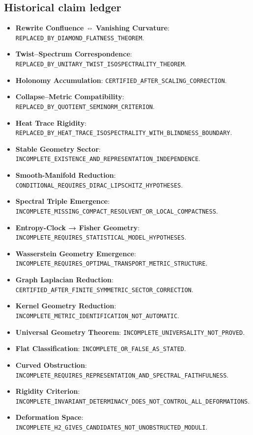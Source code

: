 \documentclass[12pt, oneside]{article}
\begin{document}
\subsection{Historical claim ledger}
\begin{itemize}
\item \textbf{Rewrite Confluence ⇔ Vanishing Curvature}: \texttt{REPLACED\_BY\_DIAMOND\_FLATNESS\_THEOREM}.
\item \textbf{Twist–Spectrum Correspondence}: \texttt{REPLACED\_BY\_UNITARY\_TWIST\_ISOSPECTRALITY\_THEOREM}.
\item \textbf{Holonomy Accumulation}: \texttt{CERTIFIED\_AFTER\_SCALING\_CORRECTION}.
\item \textbf{Collapse–Metric Compatibility}: \texttt{REPLACED\_BY\_QUOTIENT\_SEMINORM\_CRITERION}.
\item \textbf{Heat Trace Rigidity}: \texttt{REPLACED\_BY\_HEAT\_TRACE\_ISOSPECTRALITY\_WITH\_BLINDNESS\_BOUNDARY}.
\item \textbf{Stable Geometry Sector}: \texttt{INCOMPLETE\_EXISTENCE\_AND\_REPRESENTATION\_INDEPENDENCE}.
\item \textbf{Smooth-Manifold Reduction}: \texttt{CONDITIONAL\_REQUIRES\_DIRAC\_LIPSCHITZ\_HYPOTHESES}.
\item \textbf{Spectral Triple Emergence}: \texttt{INCOMPLETE\_MISSING\_COMPACT\_RESOLVENT\_OR\_LOCAL\_COMPACTNESS}.
\item \textbf{Entropy-Clock → Fisher Geometry}: \texttt{INCOMPLETE\_REQUIRES\_STATISTICAL\_MODEL\_HYPOTHESES}.
\item \textbf{Wasserstein Geometry Emergence}: \texttt{INCOMPLETE\_REQUIRES\_OPTIMAL\_TRANSPORT\_METRIC\_STRUCTURE}.
\item \textbf{Graph Laplacian Reduction}: \texttt{CERTIFIED\_AFTER\_FINITE\_SYMMETRIC\_SECTOR\_CORRECTION}.
\item \textbf{Kernel Geometry Reduction}: \texttt{INCOMPLETE\_METRIC\_IDENTIFICATION\_NOT\_AUTOMATIC}.
\item \textbf{Universal Geometry Theorem}: \texttt{INCOMPLETE\_UNIVERSALITY\_NOT\_PROVED}.
\item \textbf{Flat Classification}: \texttt{INCOMPLETE\_OR\_FALSE\_AS\_STATED}.
\item \textbf{Curved Obstruction}: \texttt{INCOMPLETE\_REQUIRES\_REPRESENTATION\_AND\_SPECTRAL\_FAITHFULNESS}.
\item \textbf{Rigidity Criterion}: \texttt{INCOMPLETE\_INVARIANT\_DETERMINACY\_DOES\_NOT\_CONTROL\_ALL\_DEFORMATIONS}.
\item \textbf{Deformation Space}: \texttt{INCOMPLETE\_H2\_GIVES\_CANDIDATES\_NOT\_UNOBSTRUCTED\_MODULI}.

\end{itemize}
\end{document}

